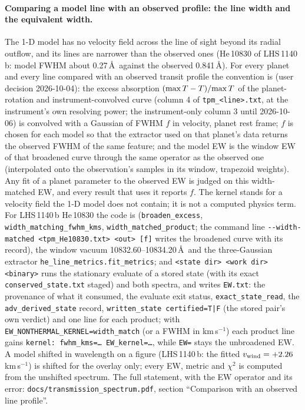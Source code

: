 \documentclass[english,a4paper]{my_memo}
\begin{document}
\paragraph{Comparing a model line with an observed profile: the line width
and the equivalent width.} The 1-D model has no velocity field across the
line of sight beyond its radial outflow, and its lines are narrower than the
observed ones (He\,10830 of LHS\,1140\,b: model FWHM about 0.27\,\AA\ against
the observed 0.841\,\AA). For every planet and every line compared with an
observed transit profile the convention is (user decision 2026-10-04): the
excess absorption $({\rm max}\,T-T)/{\rm max}\,T$ of the planet-rotation and
instrument-convolved curve (column 4 of \texttt{tpm\_<line>.txt}, at the
instrument's own resolving power; the instrument-only column 3 until
2026-10-06) is convolved with a Gaussian of FWHM $f$ in velocity, planet rest
frame; $f$ is chosen for each model so that the extractor used on that
planet's data returns the observed FWHM of the same feature; and the model
EW is the window EW of that broadened curve through the same operator as the
observed one (interpolated onto the observation's samples in its window,
trapezoid weights). Any fit of a planet parameter to the observed EW is judged
on this width-matched EW, and every result that uses it reports $f$. The
kernel stands for a velocity field the 1-D model does not contain; it is not
a computed physics term. For LHS\,1140\,b He\,10830 the code is
 (\texttt{broaden\_excess},
\texttt{width\_matching\_fwhm\_kms}, \texttt{width\_matched\_product}; the
command line \texttt{-{}-width-matched <tpm\_He10830.txt> <out> [f]} writes
the broadened curve with its record), the window vacuum
10832.60--10834.20\,\AA\ and the three-Gaussian extractor
\texttt{he\_line\_metrics.fit\_metrics}; and
\texttt{<state dir> <work dir> <binary>} runs the stationary evaluate of a
stored state (with its exact \texttt{conserved\_state.txt} staged) and both
spectra, and writes \texttt{EW.txt}: the provenance of what it consumed, the
evaluate exit status, \texttt{exact\_state\_read}, the
\texttt{adv\_derived\_state} record, \texttt{written\_state certified=T|F}
(the stored pair's own verdict) and one line for each product; with
\texttt{EW\_NONTHERMAL\_KERNEL=width\_match} (or a FWHM in km\,s$^{-1}$)
each product line gains \texttt{kernel: fwhm\_kms=\dots\ EW\_kernel=\dots},
while \texttt{EW=} stays the unbroadened EW. A model shifted in wavelength on
a figure (LHS\,1140\,b: the fitted $v_{\rm wind}=+2.26$\,km\,s$^{-1}$) is
shifted for the overlay only; every EW, metric and $\chi^2$ is computed from
the unshifted spectrum. The full statement, with the EW operator and its
error: \texttt{docs/transmission\_spectrum.pdf}, section ``Comparison with an
observed line profile''.
\end{document}
